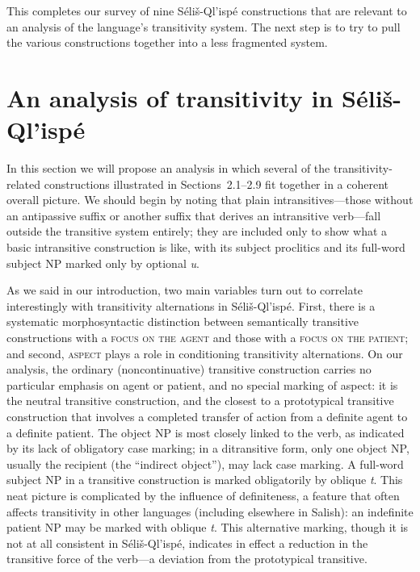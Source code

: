 \documentclass[output=paper,colorlinks,citecolor=brown]{langscibook}
\begin{document}
\bigskip

This completes our survey of nine S\'eli\v{s}-Ql'isp\'e constructions
that are relevant to an analysis of the language's transitivity
system.  The next step is to try to pull the various constructions
together into a less fragmented system.

\section{An analysis of transitivity in S\'eli\v{s}-Ql'isp\'e}  %

In this section we will propose an analysis in which several of the
transitivity-related constructions illustrated in Sections~2.1--2.9 fit
together in a coherent overall picture.  We should begin by noting
that plain intransitives---those without an antipassive suffix or
another suffix that derives an intransitive verb---fall outside the
transitive system entirely; they are included only to show what a
basic intransitive construction is like, with its subject proclitics
and its full-word subject NP marked only by optional \emph{{\textltilde}u}.


As we said in our introduction, two main variables turn out to
correlate interestingly with transitivity alternations in
S\'eli\v{s}-Ql'isp\'e.  First, there is a systematic morphosyntactic
distinction between semantically transitive constructions with a
\textsc{focus on the agent} and those with a \textsc{focus on the
patient}; and second, \textsc{aspect} plays a role in conditioning
transitivity alternations.  On our analysis, the ordinary
(noncontinuative) transitive construction carries no particular
emphasis on agent or patient, and no special marking of aspect: it is
the neutral transitive construction, and the closest to a prototypical
transitive construction that involves a completed transfer of action
from a definite agent to a definite patient.  The object NP is most
closely linked to the verb, as indicated by its lack of obligatory
case marking; in a ditransitive form, only one object NP, usually the
recipient (the ``indirect object''), may lack case marking.  A
full-word subject NP in a transitive construction is marked
obligatorily by oblique \emph{t}.  This neat picture is complicated by
the influence of definiteness, a feature that often affects
transitivity in other languages (including elsewhere in Salish): an
indefinite patient NP may be marked with oblique \emph{t}.  This
alternative marking, though it is not at all consistent in
S\'eli\v{s}-Ql'isp\'e, indicates in effect a reduction in the
transitive force of the verb---a deviation from the prototypical
transitive.
\end{document}
